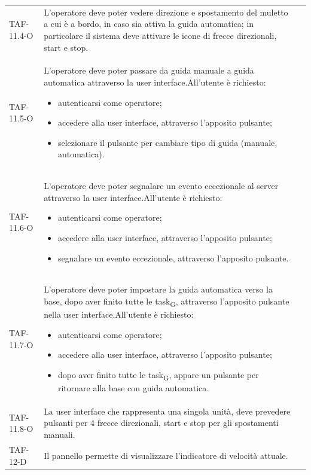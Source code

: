 \begin{longtable}{ >{\centering}p{} >{}p{}
		>{\centering}p{}}
	TAF-11.4-O & L'operatore deve poter vedere direzione e spostamento del muletto a cui è a bordo, in caso sia attiva la guida automatica; in particolare il sistema deve attivare le icone di frecce direzionali, start e stop.  & 0\tabularnewline

	TAF-11.5-O & L'operatore deve poter passare da guida manuale a guida automatica attraverso la user interface.\newline All'utente è richiesto: \begin{itemize} \item autenticarsi come operatore; \item accedere alla user interface, attraverso l'apposito pulsante; \item selezionare il pulsante per cambiare tipo di guida (manuale, automatica). \end{itemize} & 0\tabularnewline

	TAF-11.6-O & L'operatore deve poter segnalare un evento eccezionale al server attraverso la user interface.\newline All'utente è richiesto: \begin{itemize} \item autenticarsi come operatore; \item accedere alla user interface, attraverso l'apposito pulsante; \item segnalare un evento eccezionale, attraverso l'apposito pulsante.\end{itemize} & 0\tabularnewline

	TAF-11.7-O & L'operatore deve poter impostare la guida automatica verso la base, dopo aver finito tutte le task\textsubscript{G}, attraverso l'apposito pulsante nella user interface.\newline All'utente è richiesto: \begin{itemize} \item autenticarsi come operatore; \item accedere alla user interface, attraverso l'apposito pulsante; \item dopo aver finito tutte le task\textsubscript{G}, appare un pulsante per ritornare alla base con guida automatica.\end{itemize} & 0\tabularnewline

	TAF-11.8-O & La user interface che rappresenta una singola unità, deve prevedere pulsanti per 4 frecce direzionali, start e stop per gli spostamenti manuali. & 0\tabularnewline

	TAF-12-D & Il pannello permette di visualizzare l'indicatore di velocità attuale. & 0\tabularnewline


\end{longtable}
